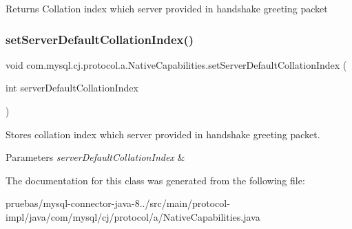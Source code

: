 \begin{DoxyReturn}{Returns}
Collation index which server provided in handshake greeting packet 
\end{DoxyReturn}
\mbox{\label{classcom_1_1mysql_1_1cj_1_1protocol_1_1a_1_1_native_capabilities_a392d20f56b7aa50f660d34ad3f88e001}} 
\subsubsection{\texorpdfstring{set\+Server\+Default\+Collation\+Index()}{setServerDefaultCollationIndex()}}
{\footnotesize\ttfamily void com.\+mysql.\+cj.\+protocol.\+a.\+Native\+Capabilities.\+set\+Server\+Default\+Collation\+Index (\begin{DoxyParamCaption}\item[{int}]{server\+Default\+Collation\+Index }\end{DoxyParamCaption})}

Stores collation index which server provided in handshake greeting packet.


\begin{DoxyParams}{Parameters}
{\em server\+Default\+Collation\+Index} & \\
\hline
\end{DoxyParams}


The documentation for this class was generated from the following file\+:\begin{DoxyCompactItemize}
\item 
pruebas/mysql-\/connector-\/java-\/8../src/main/protocol-\/impl/java/com/mysql/cj/protocol/a/Native\+Capabilities.\+java\end{DoxyCompactItemize}
